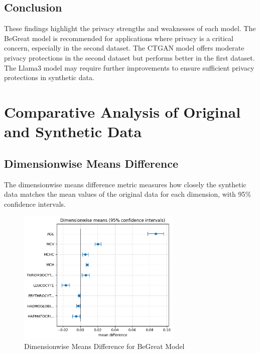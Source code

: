 \subsection{Conclusion}

These findings highlight the privacy strengths and weaknesses of each model. The BeGreat model is recommended for applications where privacy is a critical concern, especially in the second dataset. The CTGAN model offers moderate privacy protections in the second dataset but performs better in the first dataset. The Llama3 model may require further improvements to ensure sufficient privacy protections in synthetic data.






\section{Comparative Analysis of Original and Synthetic Data}

\subsection{Dimensionwise Means Difference}

The dimensionwise means difference metric measures how closely the synthetic data matches the mean values of the original data for each dimension, with 95\% confidence intervals.

\begin{figure}[H]
    \centering
    \includegraphics[width=0.7\textwidth]{images/begeat_dimension.png}
    \caption{Dimensionwise Means Difference for BeGreat Model}
    \label{fig:begreat_means_diff}
\end{figure}

